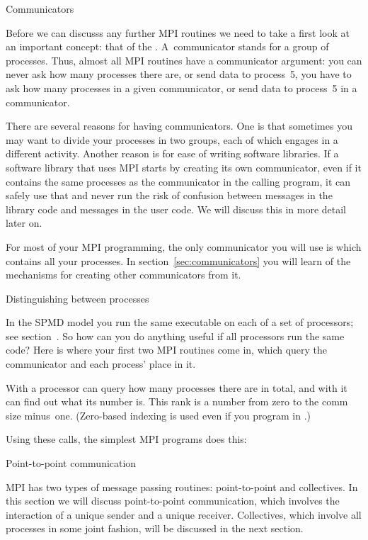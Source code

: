  {Communicators}
\label{sec:comm-intro}

Before we can discusss any further MPI routines we need to take a first look at an 
important concept: that of the . A~communicator
stands for a group of processes. Thus, almost all MPI routines have
a communicator argument: you can never ask how many processes there are, or 
send data to process~5, you have to ask how many processes in a given communicator,
or send data to process~5 in a communicator.

There are several reasons for having communicators. One is that sometimes you 
may want to divide your processes in two groups, each of which engages in a 
different activity. Another reason is for ease of writing software libraries.
If a software library that uses MPI starts by creating its own communicator,
even if it contains the same processes as the communicator in the calling program,
it can safely use that and never run the risk of confusion between messages 
in the library code and messages in the user code. We will discuss this in more detail
later on.

For most of your MPI programming, the only communicator you will use
is  which contains all your
processes. In section~\ref{sec:communicators}
you will learn of the mechanisms for creating other
communicators from it.

 {Distinguishing between processes}

In the SPMD model you run the same executable on each of a set of
processors; see section~. So how can you do anything
useful if all processors run the same code? Here is where your first
two MPI routines come in,
which query the 
 communicator and each process' place in it.

With  a processor can query how many
processes there are in total, and with  it
can find out what its number is. This rank is a number from zero to
the comm size minus~one. (Zero-based indexing is used even if you
program in .)

Using these calls, the simplest MPI programs does this:

 {Point-to-point communication}

MPI has two types of message passing routines: point-to-point and
collectives. In this section we will discuss point-to-point
communication, which involves the interaction of a unique sender and a
unique receiver. Collectives, which involve all processes in some
joint fashion, will be discussed in the next section.

